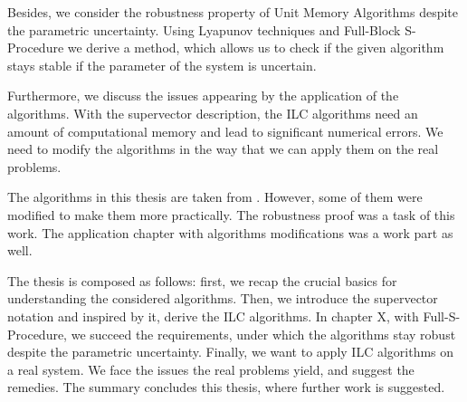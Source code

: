 Besides, we consider the robustness property of Unit Memory Algorithms despite the parametric uncertainty. Using Lyapunov techniques and 
Full-Block S-Procedure we derive a method, which allows us to check if the given algorithm stays stable if the parameter of the system is uncertain. 

Furthermore, we discuss the issues appearing by the application of the algorithms. With the supervector description, the ILC algorithms need an amount of computational memory and lead to significant numerical errors. We need to modify the algorithms in the way that we can apply them on the real problems.

The algorithms in this thesis are taken from \cite{ILC}. However, some of them were modified to make them more practically. The robustness proof was a task of this work. The application chapter with algorithms modifications was a  work part as well. 

The thesis is composed as follows: first, we recap the crucial basics for understanding the considered algorithms. Then, we introduce the supervector notation and inspired by it, derive the ILC algorithms. In chapter X, with Full-S-Procedure, we succeed the requirements, under which the algorithms stay robust despite the parametric uncertainty. Finally, we want to apply ILC algorithms on a real system. We face the issues the real problems yield, and suggest the remedies. The summary concludes this thesis, where further work is suggested. 








